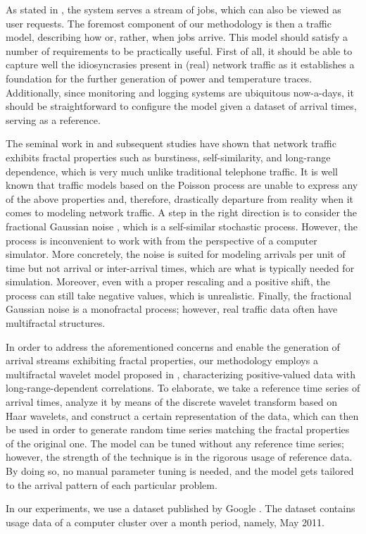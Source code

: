 As stated in , the system serves a stream of jobs,
which can also be viewed as user requests. The foremost component of our
methodology is then a traffic model, describing how or, rather, when jobs
arrive. This model should satisfy a number of requirements to be practically
useful. First of all, it should be able to capture well the idiosyncrasies
present in (real) network traffic as it establishes a foundation for the further
generation of power and temperature traces. Additionally, since monitoring and
logging systems are ubiquitous now-a-days, it should be straightforward to
configure the model given a dataset of arrival times, serving as a reference.

The seminal work in \cite{leland1994} and subsequent studies have shown that
network traffic exhibits fractal properties such as burstiness, self-similarity,
and long-range dependence, which is very much unlike traditional telephone
traffic. It is well known that traffic models based on the Poisson process
\cite{lifshits2014} are unable to express any of the above properties and,
therefore, drastically departure from reality when it comes to modeling network
traffic. A step in the right direction is to consider the fractional Gaussian
noise \cite{lifshits2014}, which is a self-similar stochastic process. However,
the process is inconvenient to work with from the perspective of a computer
simulator. More concretely, the noise is suited for modeling arrivals per unit
of time but not arrival or inter-arrival times, which are what is typically
needed for simulation. Moreover, even with a proper rescaling and a positive
shift, the process can still take negative values, which is unrealistic.
Finally, the fractional Gaussian noise is a monofractal process; however, real
traffic data often have multifractal structures.

In order to address the aforementioned concerns and enable the generation of
arrival streams exhibiting fractal properties, our methodology employs a
multifractal wavelet model proposed in \cite{riedi1999}, characterizing
positive-valued data with long-range-dependent correlations. To elaborate, we
take a reference time series of arrival times, analyze it by means of the
discrete wavelet transform based on Haar wavelets, and construct a certain
representation of the data, which can then be used in order to generate random
time series matching the fractal properties of the original one. The model can
be tuned without any reference time series; however, the strength of the
technique is in the rigorous usage of reference data. By doing so, no manual
parameter tuning is needed, and the model gets tailored to the arrival pattern
of each particular problem.

In our experiments, we use a dataset published by Google \cite{google}. The
dataset contains usage data of a computer cluster over a month period, namely,
May 2011.
